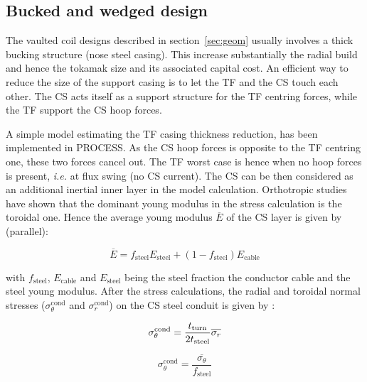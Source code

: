\documentclass[hidelinks]{article}
\numberwithin{equation}{section}
\begin{document}
    \subsection{Bucked and wedged design}

    \noindent The vaulted coil designs described in section~\ref{sec:geom} 
    usually involves a thick bucking structure (nose steel casing). This 
    increase substantially the radial build and hence the tokamak size and 
    its associated capital cost. An efficient way to reduce the size of the 
    support casing is to let the TF and the CS touch each other. The CS acts
    itself as a support structure for the TF centring forces, while the TF
    support the CS hoop forces. \newline

    \noindent A simple model estimating the TF casing thickness reduction, has
    been implemented in PROCESS. As the CS hoop forces is opposite to the 
    TF centring one, these two forces cancel out. The TF worst case is hence
    when no hoop forces is present, \textit{i.e.} at flux swing (no CS current).
    The CS can be then considered as an additional inertial inner layer in the
    model calculation. Orthotropic studies~\cite{J.Last2013} have shown that the
    dominant young modulus in the stress calculation is the toroidal one. Hence
    the average young modulus $\overline{E}$ of the CS layer is given by 
    (parallel):

    \begin{equation}
        \overline{E} = f_\mathrm{steel}E_\mathrm{steel} + (1-f_\mathrm{steel}
        )E_\mathrm{cable}
    \end{equation}

    \noindent with $f_\mathrm{steel}$, $E_\mathrm{cable}$ and $E_\mathrm{steel}$
    being the steel fraction the conductor cable and the steel young modulus.
    After the stress calculations, the radial and toroidal normal stresses 
    ($\sigma_\theta^\mathrm{cond}$ and $\sigma_r^\mathrm{cond}$) on the CS steel
    conduit is given by :

    \begin{equation}
        \sigma_\theta^\mathrm{cond} = \frac{t_\mathrm{turn}}{2t_\mathrm{steel}}\overline{\sigma_r} \\
     \end{equation}

    \begin{equation}
        \sigma_\theta^\mathrm{cond} = \frac{\overline{\sigma_\theta}}{f_\mathrm{steel}} 
    \end{equation}
\end{document}
